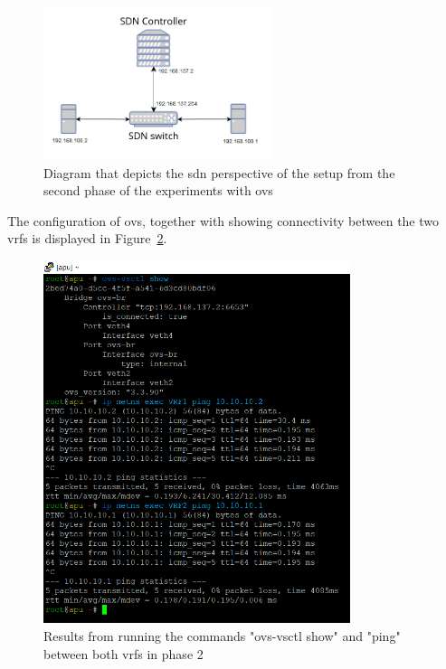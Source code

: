 \begin{figure}
	\centering
	\includegraphics[width=0.6\textwidth]{Chapters/Figures/tests/ovs_phase_2/sdn_diagram.PNG}
	\caption{Diagram that depicts the \gls{sdn} perspective of the setup from the second phase of the experiments with \gls{ovs}}
	\label{fig:exp1_phase2_sdn_diagram}
\end{figure}

The configuration of \gls{ovs}, together with showing connectivity between the two \glspl{vrf} is displayed in Figure~\ref{fig:exp1_phase2_pings}.

\begin{figure}
	\centering
	\includegraphics[width=0.8\textwidth]{Chapters/Figures/tests/ovs_phase_2/ovs_config_&_pings.PNG}
	\caption{Results from running the commands "ovs-vsctl show" and "ping" between both \glspl{vrf} in phase 2}
	\label{fig:exp1_phase2_pings}
\end{figure}

